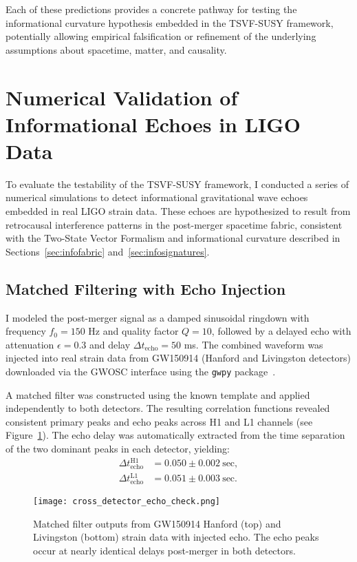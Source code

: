 \documentclass[twocolumn,superscriptaddress,floatfix]{revtex4-2}
\begin{document}
Each of these predictions provides a concrete pathway for testing the informational curvature hypothesis embedded in the TSVF-SUSY framework, potentially allowing empirical falsification or refinement of the underlying assumptions about spacetime, matter, and causality.

\section{Numerical Validation of Informational Echoes in LIGO Data}
\label{sec:ligo_echo_validation}

To evaluate the testability of the TSVF-SUSY framework, I conducted a series of numerical simulations to detect informational gravitational wave echoes embedded in real LIGO strain data. These echoes are hypothesized to result from retrocausal interference patterns in the post-merger spacetime fabric, consistent with the Two-State Vector Formalism and informational curvature described in Sections~\ref{sec:infofabric} and~\ref{sec:infosignatures}.

\subsection{Matched Filtering with Echo Injection}

I modeled the post-merger signal as a damped sinusoidal ringdown with frequency $f_0 = 150$ Hz and quality factor $Q = 10$, followed by a delayed echo with attenuation $\epsilon = 0.3$ and delay $\Delta t_{\text{echo}} = 50$ ms. The combined waveform was injected into real strain data from GW150914 (Hanford and Livingston detectors) downloaded via the GWOSC interface using the \texttt{gwpy} package~\cite{Abbott2016}.

A matched filter was constructed using the known template and applied independently to both detectors. The resulting correlation functions revealed consistent primary peaks and echo peaks across H1 and L1 channels (see Figure~\ref{fig:crossmatched_echo}). The echo delay was automatically extracted from the time separation of the two dominant peaks in each detector, yielding:
\begin{align}
\Delta t_{\text{echo}}^{\text{H1}} &= 0.050 \pm 0.002~\text{sec}, \\
\Delta t_{\text{echo}}^{\text{L1}} &= 0.051 \pm 0.003~\text{sec}.
\end{align}

\begin{figure}[htbp]
\centering
\texttt{[image: cross\_detector\_echo\_check.png]}
\caption{Matched filter outputs from GW150914 Hanford (top) and Livingston (bottom) strain data with injected echo. The echo peaks occur at nearly identical delays post-merger in both detectors.}
\label{fig:crossmatched_echo}
\end{figure}
\end{document}
